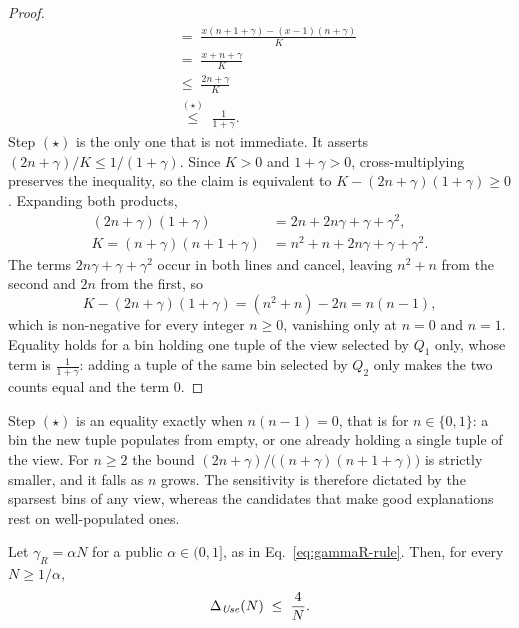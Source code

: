 \begin{proof}
\begin{align*}
&\;=\;\frac{x(n+1+\gamma)-(x-1)(n+\gamma)}{K}\\[2pt]
&\;=\;\frac{x+n+\gamma}{K}\\[2pt]
&\;\le\;\frac{2n+\gamma}{K}\\[2pt]
&\;\overset{(\star)}{\le}\;\frac{1}{1+\gamma}.
\end{align*}
Step $(\star)$ is the only one that is not immediate.
It asserts $(2n+\gamma)/K\le 1/(1+\gamma)$.
Since $K>0$ and $1+\gamma>0$, cross-multiplying preserves the inequality, so the claim is equivalent to $K-(2n+\gamma)(1+\gamma)\ge0$.
Expanding both products,
\begin{align*}
(2n+\gamma)(1+\gamma)&=2n+2n\gamma+\gamma+\gamma^2,\\[2pt]
K=(n+\gamma)(n+1+\gamma)&=n^2+n+2n\gamma+\gamma+\gamma^2 .
\end{align*}
The terms $2n\gamma+\gamma+\gamma^2$ occur in both lines and cancel, leaving $n^2+n$ from the second and $2n$ from the first, so
\[
K-(2n+\gamma)(1+\gamma)=(n^2+n)-2n=n(n-1),
\]
which is non-negative for every integer $n\ge0$, vanishing only at $n=0$ and $n=1$.
Equality holds for a bin holding one tuple of the view selected by $Q_1$ only, whose term is $\frac{1}{1+\gamma}$: adding a tuple of the same bin selected by $Q_2$ only makes the two counts equal and the term $0$.
\end{proof}

Step $(\star)$ is an equality exactly when $n(n-1)=0$, that is for $n\in\{0,1\}$: a bin the new tuple populates from empty, or one already holding a single tuple of the view.
For $n\ge2$ the bound $(2n+\gamma)/\big((n+\gamma)(n+1+\gamma)\big)$ is strictly smaller, and it falls as $n$ grows.
The sensitivity is therefore dictated by the sparsest bins of any view, whereas the candidates that make good explanations rest on well-populated ones.

\begin{lemma}
\label{lem:usefulness}
Let $\gamma_R=\alpha N$ for a public $\alpha\in(0,1]$, as in Eq.~\eqref{eq:gammaR-rule}.
Then, for every $N\ge1/\alpha$,
\[ \Delta_{\mathit{Use}}(N)\;\le\;\frac{4}{N}. \]
\end{lemma}

